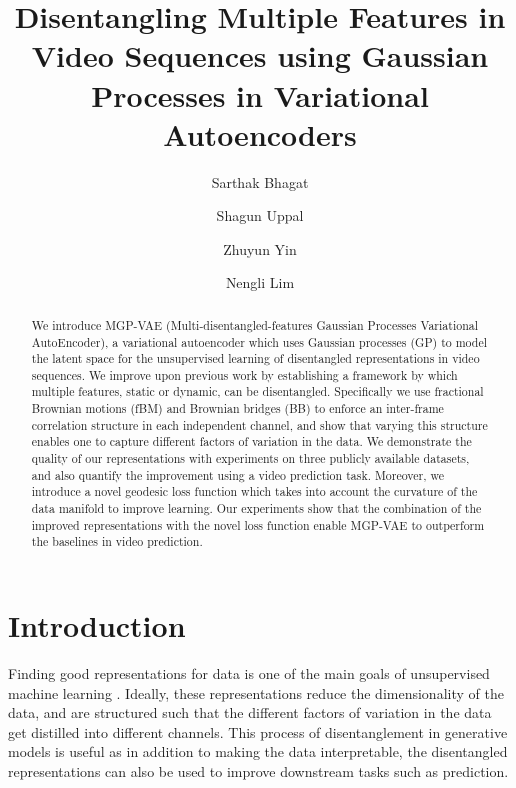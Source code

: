 \documentclass[runningheads]{llncs}
\makeatletter
\newcommand{\printfnsymbol}[1]{\textsuperscript{\@fnsymbol{#1}}}
\makeatother
\begin{document}
\pagestyle{headings}
	\mainmatter
	\def\ECCVSubNumber{4234}  

	\title{Disentangling Multiple Features in Video Sequences using Gaussian Processes in Variational Autoencoders}
	




\author{Sarthak Bhagat \and
		Shagun Uppal\printfnsymbol{1} \and
		Zhuyun Yin \and
		Nengli Lim
	}
\maketitle


\begin{abstract}
We introduce MGP-VAE (Multi-disentangled-features Gaussian Processes Variational AutoEncoder), a variational autoencoder which uses Gaussian processes (GP) to model the latent space for the unsupervised learning of disentangled representations in video sequences. We improve upon previous work by establishing a framework by which multiple features, static or dynamic, can be disentangled. Specifically we use fractional Brownian motions (fBM) and Brownian bridges (BB) to enforce an inter-frame correlation structure in each independent channel, and show that varying this structure enables one to capture different factors of variation in the data. We demonstrate the quality of our representations with experiments on three publicly available datasets, and also quantify the improvement using a video prediction task. Moreover, we introduce a novel geodesic loss function which takes into account the curvature of
the data manifold to improve learning. Our experiments show that the combination of the improved representations with the novel loss function enable MGP-VAE to outperform the baselines in video prediction.
\end{abstract}


\section{Introduction}
   Finding good representations for data is one of the main goals of unsupervised machine learning \cite{Bengio2012RepresentationLA}. Ideally, these representations reduce the dimensionality of the data, and are structured such that the different factors of variation in the data get distilled into different channels. This process of disentanglement in generative models is useful as in addition to making the data interpretable, the disentangled representations can also be used to improve downstream tasks such as prediction. \par 
   
\end{document}
